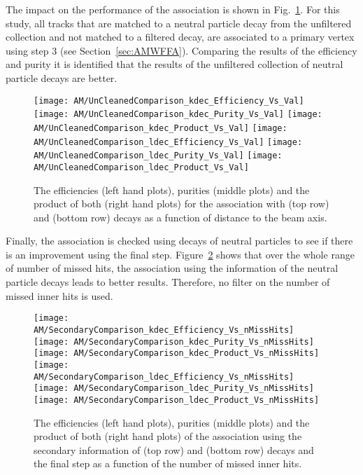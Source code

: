 The impact on the performance of the association is shown in Fig.~\ref{plot:AMWFSVdecEffAndPurRT}. For this study, all tracks that are matched to a neutral particle decay from the unfiltered collection and not matched to a filtered decay, are associated to a primary vertex using step 3 (see Section~\ref{sec:AMWFFA}). Comparing the results of the efficiency and purity it is identified that the results of the unfiltered collection of neutral particle decays are better.

\begin{figure}[!ht]
    \centering
    \texttt{[image: AM/UnCleanedComparison\_kdec\_Efficiency\_Vs\_Val]}
    \texttt{[image: AM/UnCleanedComparison\_kdec\_Purity\_Vs\_Val]}
    \texttt{[image: AM/UnCleanedComparison\_kdec\_Product\_Vs\_Val]}
    \newline
    \texttt{[image: AM/UnCleanedComparison\_ldec\_Efficiency\_Vs\_Val]}
    \texttt{[image: AM/UnCleanedComparison\_ldec\_Purity\_Vs\_Val]}
    \texttt{[image: AM/UnCleanedComparison\_ldec\_Product\_Vs\_Val]}
    \caption[Efficiency, purity and their product for the association with \PKzS{} and \PgL{} decays a function of distance to the beam axis]{The efficiencies (left hand plots), purities (middle plots) and the product of both (right hand plots) for the association with \PKzS{} (top row) and \PgL{} (bottom row) decays as a function of distance to the beam axis. \label{plot:AMWFSVdecEffAndPurRT}}
\end{figure}

Finally, the association is checked using decays of neutral particles to see if there is an improvement using the final step. Figure~\ref{plot:AMWFSVdecEffAndPurVsFA} shows that over the whole range of number of missed hits, the association using the information of the neutral particle decays leads to better results. Therefore, no filter on the number of missed inner hits is used.

\begin{figure}[!ht]
    \centering
    \texttt{[image: AM/SecondaryComparison\_kdec\_Efficiency\_Vs\_nMissHits]}
    \texttt{[image: AM/SecondaryComparison\_kdec\_Purity\_Vs\_nMissHits]}
    \texttt{[image: AM/SecondaryComparison\_kdec\_Product\_Vs\_nMissHits]}
    \newline
    \texttt{[image: AM/SecondaryComparison\_ldec\_Efficiency\_Vs\_nMissHits]}
    \texttt{[image: AM/SecondaryComparison\_ldec\_Purity\_Vs\_nMissHits]}
    \texttt{[image: AM/SecondaryComparison\_ldec\_Product\_Vs\_nMissHits]}
    \caption[Efficiency, purity and their product for the association with \PKzS{} and \PgL{} decays vs final association as a function of missed inner hits]{The efficiencies (left hand plots), purities (middle plots) and the product of both (right hand plots) of the association using the secondary information of \PKzS{} (top row) and \PgL{} (bottom row) decays and the final step as a function of the number of missed inner hits.\label{plot:AMWFSVdecEffAndPurVsFA}}
\end{figure}

